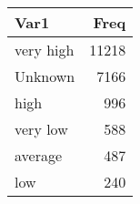 \begin{table}[H]
\centering
\begin{tabular}[t]{lr}
\toprule
Var1 & Freq\\
\midrule
very high & 11218\\
Unknown & 7166\\
high & 996\\
very low & 588\\
average & 487\\
\addlinespace
low & 240\\
\bottomrule
\end{tabular}
\end{table}